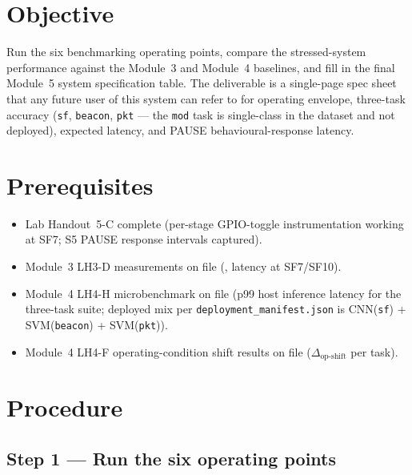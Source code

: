 \documentclass[11pt,letterpaper]{article}
\begin{document}

\section{Objective}
Run the six benchmarking operating points, compare the stressed-system performance against the Module~3 and Module~4 baselines, and fill in the final Module~5 system specification table. The deliverable is a single-page spec sheet that any future user of this system can refer to for operating envelope, three-task accuracy (\texttt{sf}, \texttt{beacon}, \texttt{pkt} --- the \texttt{mod} task is single-class in the dataset and not deployed), expected latency, and PAUSE behavioural-response latency.

\section{Prerequisites}
\begin{itemize}[leftmargin=2em]
	\item Lab Handout~5-C complete (per-stage \mbox{GPIO}-toggle instrumentation working at SF7; S5 PAUSE response intervals captured).
	\item Module~3 LH3-D measurements on file (\PER{}, latency at SF7/SF10).
	\item Module~4 LH4-H microbenchmark on file (p99 host inference latency for the three-task suite; deployed mix per \texttt{deployment\_manifest.json} is CNN(\texttt{sf}) + SVM(\texttt{beacon}) + SVM(\texttt{pkt})).
	\item Module~4 LH4-F operating-condition shift results on file ($\Delta_{\text{op-shift}}$ per task).
\end{itemize}

\section{Procedure}

\subsection{Step 1 --- Run the six operating points}
\end{document}

